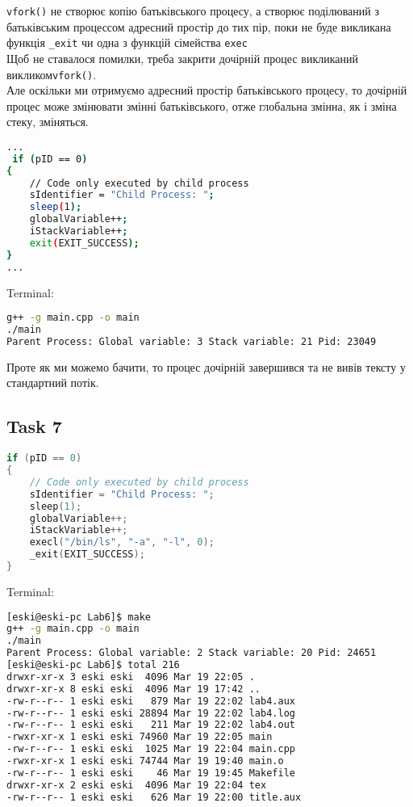 \documentclass{article}
\begin{document}
\texttt{vfork()} не створює копію батьківського процесу, а створює поділюваний з батьківським процессом адресний простір до тих пір, поки не буде викликана функція \texttt{\_exit} чи одна з функцій сімейства \texttt{exec}
\\

Щоб не ставалося помилки, треба закрити дочірній процес викликаний викликом\texttt{vfork()}.
\\

Але оскільки ми отримуємо адресний простір батьківського процесу, то дочірній процес може змінювати змінні батьківського, отже глобальна змінна, як і зміна стеку, зміняться.

\begin{lstlisting}[language=BASH]
...
 if (pID == 0)
{
	// Code only executed by child process
	sIdentifier = "Child Process: ";
	sleep(1);
	globalVariable++;
	iStackVariable++;
	exit(EXIT_SUCCESS);
}
...
\end{lstlisting}
Terminal:
\begin{lstlisting}[language=BASH]
g++ -g main.cpp -o main
./main
Parent Process: Global variable: 3 Stack variable: 21 Pid: 23049
\end{lstlisting}

Проте  як ми можемо бачити, то процес дочірній завершився та не вивів тексту у стандартний потік.
\\

\newpage
\subsection*{Task 7}
\begin{lstlisting}[language=C]
 if (pID == 0)
{
	// Code only executed by child process
	sIdentifier = "Child Process: ";
	sleep(1);
	globalVariable++;
	iStackVariable++;
	execl("/bin/ls", "-a", "-l", 0);
	_exit(EXIT_SUCCESS);
}
\end{lstlisting}
Terminal:
\begin{lstlisting}[language=BASH]
[eski@eski-pc Lab6]$ make
g++ -g main.cpp -o main
./main
Parent Process: Global variable: 2 Stack variable: 20 Pid: 24651
[eski@eski-pc Lab6]$ total 216
drwxr-xr-x 3 eski eski  4096 Mar 19 22:05 .
drwxr-xr-x 8 eski eski  4096 Mar 19 17:42 ..
-rw-r--r-- 1 eski eski   879 Mar 19 22:02 lab4.aux
-rw-r--r-- 1 eski eski 28894 Mar 19 22:02 lab4.log
-rw-r--r-- 1 eski eski   211 Mar 19 22:02 lab4.out
-rwxr-xr-x 1 eski eski 74960 Mar 19 22:05 main
-rw-r--r-- 1 eski eski  1025 Mar 19 22:04 main.cpp
-rwxr-xr-x 1 eski eski 74744 Mar 19 19:40 main.o
-rw-r--r-- 1 eski eski    46 Mar 19 19:45 Makefile
drwxr-xr-x 2 eski eski  4096 Mar 19 22:04 tex
-rw-r--r-- 1 eski eski   626 Mar 19 22:00 title.aux
\end{lstlisting}
\end{document}
